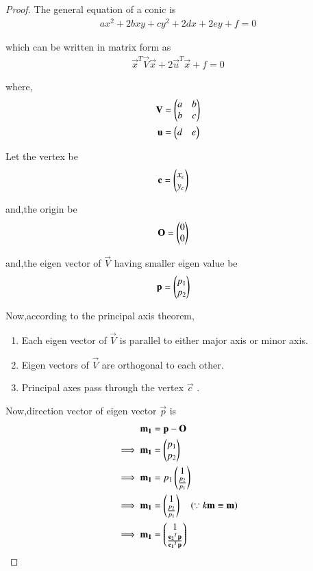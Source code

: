 \documentclass[journal,12pt,twocolumn]{IEEEtran}
\begin{document}
\begin{proof}
The general equation of a conic is
\begin{align}
  ax^2+2bxy+cy^2+2dx+2ey+f=0
\end{align}

which can be written in matrix form as
\begin{align}
    \vec{x}^T\vec{V}\vec{x} + 2\vec{u}^T\vec{x} + f =0
\end{align}

where,
\begin{align}
    \mathbf{V} &=\begin{pmatrix}a & b \\ b& c\end{pmatrix}
    \\
    \mathbf{u} &= \begin{pmatrix}d & e\end{pmatrix}
\end{align}

Let the vertex be
\begin{align}
    \mathbf{c} &= \begin{pmatrix}x_c \\ y_c\end{pmatrix}
\end{align}

and,the origin be
\begin{align}
    \mathbf{O} &= \begin{pmatrix}0 \\ 0\end{pmatrix}
\end{align}

and,the eigen vector of $\vec{V}$ having smaller eigen value be
\begin{align}
    \mathbf{p} &= \begin{pmatrix}p_1 \\ p_2\end{pmatrix}
\end{align}

Now,according to the principal axis theorem,
\begin{enumerate}
    \item Each eigen vector of $\vec{V}$ is parallel to either major axis or minor axis.
    \item Eigen vectors of $\vec{V}$ are orthogonal to each other.
    \item Principal axes pass through the vertex $\vec{c}$ .
\end{enumerate}

Now,direction vector of eigen vector $\vec{p}$ is 
\begin{align}
    \mathbf{m_1} &= \mathbf{p}-\mathbf{O} \\
    \implies \mathbf{m_1} &= \begin{pmatrix}p_1 \\ p_2\end{pmatrix} \\
    \implies \mathbf{m_1} &= p_1\begin{pmatrix}1 \\ \frac{p_2}{p_1}\end{pmatrix} \\
    \implies \mathbf{m_1} &= \begin{pmatrix}1 \\ \frac{p_2}{p_1}\end{pmatrix} \quad \left(\because k\mathbf{m} \equiv \mathbf{m}\right) \\
    \implies \mathbf{m_1} &= \begin{pmatrix}1 \\ \frac{\mathbf{e_2}^T\mathbf{p}}{\mathbf{e_1}^T\mathbf{p}}\end{pmatrix}
\end{align}


\end{proof}
\end{document}
